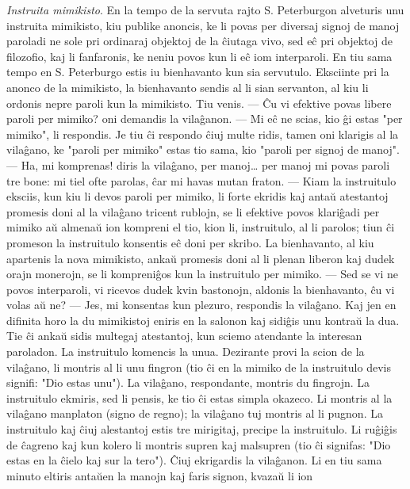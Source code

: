 \emph{Instruita mimikisto}. En la tempo de la servuta rajto S.
Peterburgon alveturis unu instruita mimikisto, kiu publike anoncis,
ke li povas per diversaj signoj de manoj paroladi ne sole pri
ordinaraj objektoj de la \^ciutaga vivo, sed e\^c pri objektoj de
filozofio, kaj li fanfaronis, ke neniu povos kun li e\^c iom
interparoli. En tiu sama tempo en S. Peterburgo estis iu bienhavanto
kun sia servutulo. Eksciinte pri la anonco de la mimikisto, la
bienhavanto sendis al li sian servanton, al kiu li ordonis nepre
paroli kun la mimikisto. Tiu venis. --- \^Cu vi efektive povas
libere paroli per mimiko? oni demandis la vila\^ganon. --- Mi e\^c
ne scias, kio \^gi estas "per mimiko", li respondis. Je tiu \^ci
respondo \^ciuj multe ridis, tamen oni klarigis al la vila\^gano, ke
"paroli per mimiko" estas tio sama, kio "paroli per signoj de
manoj". --- Ha, mi komprenas! diris la vila\^gano, per manoj\dots
per manoj mi povas paroli tre bone: mi tiel ofte parolas, \^car mi
havas mutan fraton.
 --- Kiam la instruitulo eksciis, kun kiu li devos paroli per mimiko,
li forte ekridis kaj anta\u u atestantoj promesis doni al la
vila\^gano tricent rublojn, se li efektive povos klari\^gadi per
mimiko a\u u almena\u u ion kompreni el tio, kion li, instruitulo,
al li parolos; tiun \^ci promeson la instruitulo konsentis e\^c doni
per skribo. La bienhavanto, al kiu apartenis la nova mimikisto,
anka\u u promesis doni al li plenan liberon kaj dudek orajn
monerojn, se li kompreni\^gos kun la instruitulo per mimiko. --- Sed
se vi ne povos interparoli, vi ricevos dudek kvin bastonojn, aldonis
la bienhavanto, \^cu vi volas a\u u ne? --- Jes, mi konsentas kun
plezuro, respondis la vila\^gano. Kaj jen en difinita horo la du
mimikistoj eniris en la salonon kaj sidi\^gis unu kontra\u u la dua.
Tie \^ci anka\u u sidis multegaj atestantoj, kun sciemo atendante la
interesan paroladon. La instruitulo komencis la unua. Dezirante
provi la scion de la vila\^gano, li montris al li unu fingron (tio
\^ci en la mimiko de la instruitulo devis signifi: "Dio estas
unu"). La vila\^gano, respondante, montris du fingrojn. La
instruitulo ekmiris, sed li pensis, ke tio \^ci estas simpla
okazeco. Li montris al la vila\^gano manplaton (signo de regno); la
vila\^gano tuj montris al li pugnon. La instruitulo kaj \^ciuj
alestantoj estis tre mirigitaj, precipe la instruitulo. Li
ru\^gi\^gis de \^cagreno kaj kun kolero li montris supren kaj
malsupren (tio \^ci signifas: "Dio estas en la \^cielo kaj sur la
tero"). \^Ciuj ekrigardis la vila\^ganon. Li en tiu sama minuto
eltiris anta\u uen la manojn kaj faris signon, kvaza\u u li ion

